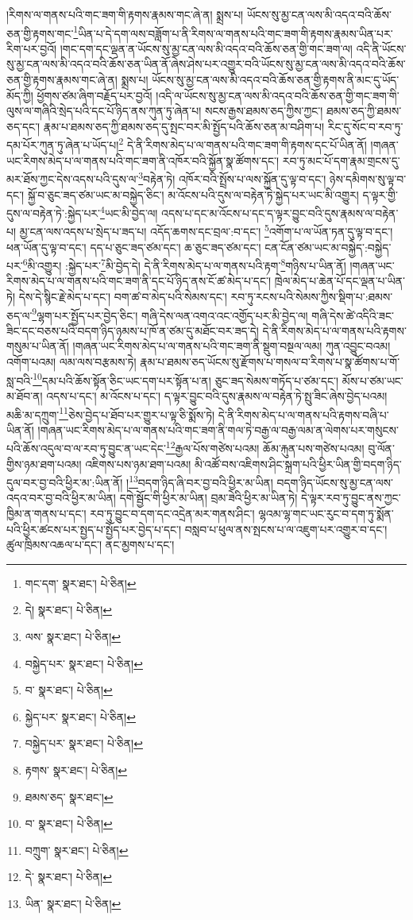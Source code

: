 །རིགས་ལ་གནས་པའི་གང་ཟག་གི་རྟགས་རྣམས་གང་ཞེ་ན། སྨྲས་པ། ཡོངས་སུ་མྱ་ངན་ལས་མི་འདའ་བའི་ཆོས་ཅན་གྱི་རྟགས་གང་\footnote{གང་དག་  སྣར་ཐང་།  པེ་ཅིན། }ཡིན་པ་དེ་དག་ལས་བཟློག་པ་ནི་རིགས་ལ་གནས་པའི་གང་ཟག་གི་རྟགས་རྣམས་ཡིན་པར་རིག་པར་བྱའོ། །གང་དག་དང་ལྡན་ན་ཡོངས་སུ་མྱ་ངན་ལས་མི་འདའ་བའི་ཆོས་ཅན་གྱི་གང་ཟག་ལ། འདི་ནི་ཡོངས་སུ་མྱ་ངན་ལས་མི་འདའ་བའི་ཆོས་ཅན་ཡིན་ནོ་ཞེས་ཤེས་པར་འགྱུར་བའི་ཡོངས་སུ་མྱ་ངན་ལས་མི་འདའ་བའི་ཆོས་ཅན་གྱི་རྟགས་རྣམས་གང་ཞེ་ན། སྨྲས་པ། ཡོངས་སུ་མྱ་ངན་ལས་མི་འདའ་བའི་ཆོས་ཅན་གྱི་རྟགས་ནི་མང་དུ་ཡོད་མོད་ཀྱི། ཕྱོགས་ཙམ་ཞིག་བརྗོད་པར་བྱའོ། །འདི་ལ་ཡོངས་སུ་མྱ་ངན་ལས་མི་འདའ་བའི་ཆོས་ཅན་གྱི་གང་ཟག་གི་ལུས་ལ་གཞིའི་སྲེད་པའི་དང་པོ་ཉིད་ནས་ཀུན་ཏུ་ཞེན་པ། སངས་རྒྱས་ཐམས་ཅད་ཀྱིས་ཀྱང་། ཐམས་ཅད་ཀྱི་ཐམས་ཅད་དང་། རྣམ་པ་ཐམས་ཅད་ཀྱི་ཐམས་ཅད་དུ་སྤང་བར་མི་སྤྱོད་པའི་ཆོས་ཅན་མ་བཤིག་པ། རིང་དུ་སོང་བ་རབ་ཏུ་དམ་པོར་ཀུན་ཏུ་ཞེན་པ་ཡོད་པ།\footnote{དེ།  སྣར་ཐང་།  པེ་ཅིན། } དེ་ནི་རིགས་མེད་པ་ལ་གནས་པའི་གང་ཟག་གི་རྟགས་དང་པོ་ཡིན་ནོ། །གཞན་ཡང་རིགས་མེད་པ་ལ་གནས་པའི་གང་ཟག་ནི་འཁོར་བའི་སྐྱོན་སྣ་ཚོགས་དང་། རབ་ཏུ་མང་པོ་དག་རྣམ་གྲངས་དུ་མར་ཐོས་ཀྱང་དེས་འདས་པའི་དུས་ལ་\footnote{ལས་  སྣར་ཐང་།  པེ་ཅིན། }བརྟེན་ཏེ། འཁོར་བའི་སྤྲོས་པ་ལས་སྐྱོན་དུ་ལྟ་བ་དང་། ཉེས་དམིགས་སུ་ལྟ་བ་དང་། སྐྱོ་བ་ཅུང་ཟད་ཙམ་ཡང་མ་བསྐྱེད་ཅིང་། མ་འོངས་པའི་དུས་ལ་བརྟེན་ཏེ་སྐྱེད་པར་ཡང་མི་འགྱུར། ད་ལྟར་གྱི་དུས་ལ་བརྟེན་ཏེ་:སྐྱེད་པར་\footnote{བསྐྱེད་པར་  སྣར་ཐང་།  པེ་ཅིན། }ཡང་མི་བྱེད་ལ། འདས་པ་དང་མ་འོངས་པ་དང་ད་ལྟར་བྱུང་བའི་དུས་རྣམས་ལ་བརྟེན་པ། མྱ་ངན་ལས་འདས་པ་སྲེད་པ་ཟད་པ། འདོད་ཆགས་དང་བྲལ་:བ་དང་། \footnote{བ་  སྣར་ཐང་།  པེ་ཅིན། }འགོག་པ་ལ་ཡོན་ཏན་དུ་ལྟ་བ་དང་། ཕན་ཡོན་དུ་ལྟ་བ་དང་། དད་པ་ཅུང་ཟད་ཙམ་དང་། ཆ་ཅུང་ཟད་ཙམ་དང་། ངན་ངོན་ཙམ་ཡང་མ་བསྐྱེད་:བསྐྱེད་པར་\footnote{སྐྱེད་པར་  སྣར་ཐང་།  པེ་ཅིན། }མི་འགྱུར། :སྐྱེད་པར་\footnote{བསྐྱེད་པར་  སྣར་ཐང་།  པེ་ཅིན། }མི་བྱེད་དེ། དེ་ནི་རིགས་མེད་པ་ལ་གནས་པའི་རྟག་\footnote{རྟགས་  སྣར་ཐང་།  པེ་ཅིན། }གཉིས་པ་ཡིན་ནོ། །གཞན་ཡང་རིགས་མེད་པ་ལ་གནས་པའི་གང་ཟག་ནི་དང་པོ་ཉིད་ནས་ངོ་ཚ་མེད་པ་དང་། ཁྲེལ་མེད་པ་ཆེན་པོ་དང་ལྡན་པ་ཡིན་ཏེ། དེས་དེ་སྙིང་རྗེ་མེད་པ་དང་། བག་ཚ་བ་མེད་པའི་སེམས་དང་། རབ་ཏུ་རངས་པའི་སེམས་ཀྱིས་སྡིག་པ་:ཐམས་ཅད་ལ་\footnote{ཐམས་ཅད་  སྣར་ཐང་། }ལྷག་པར་སྤྱོད་པར་བྱེད་ཅིང་། གཞི་དེས་ལན་འགའ་འང་འགྱོད་པར་མི་བྱེད་ལ། གཞི་དེས་ཚེ་འདིའི་ཟང་ཟིང་དང་བཅས་པའི་བདག་ཉིད་ཉམས་པ་ཁོ་ན་ཙམ་དུ་མཐོང་བར་ཟད་དེ། དེ་ནི་རིགས་མེད་པ་ལ་གནས་པའི་རྟགས་གསུམ་པ་ཡིན་ནོ། །གཞན་ཡང་རིགས་མེད་པ་ལ་གནས་པའི་གང་ཟག་ནི་སྡུག་བསྔལ་ལམ། ཀུན་འབྱུང་བའམ། འགོག་པའམ། ལམ་ལས་བརྩམས་ཏེ། རྣམ་པ་ཐམས་ཅད་ཡོངས་སུ་རྫོགས་པ་གསལ་བ་རིགས་པ་སྣ་ཚོགས་པ་གོ་སླ་བའི་\footnote{བ་  སྣར་ཐང་།  པེ་ཅིན། }དམ་པའི་ཆོས་སྟོན་ཅིང་ཡང་དག་པར་སྟོན་པ་ན། ཅུང་ཟད་སེམས་གཏོད་པ་ཙམ་དང་། མོས་པ་ཙམ་ཡང་མ་ཐོབ་ན། འདས་པ་དང་། མ་འོངས་པ་དང་། ད་ལྟར་བྱུང་བའི་དུས་རྣམས་ལ་བརྟེན་ཏེ་སྤུ་ཟིང་ཞེས་བྱེད་པའམ། མཆི་མ་དཀྲུག་\footnote{བཀྲུག་  སྣར་ཐང་།  པེ་ཅིན། }ཅེས་བྱེད་པ་ཐོབ་པར་གྱུར་པ་ལྟ་ཅི་སྨོས་ཏེ། དེ་ནི་རིགས་མེད་པ་ལ་གནས་པའི་རྟགས་བཞི་པ་ཡིན་ནོ། །གཞན་ཡང་རིགས་མེད་པ་ལ་གནས་པའི་གང་ཟག་ནི་གལ་ཏེ་བརྒྱ་ལ་བརྒྱ་ལམ་ན་ལེགས་པར་གསུངས་པའི་ཆོས་འདུལ་བ་ལ་རབ་ཏུ་བྱུང་ན་ཡང་དེང་\footnote{དེ་  སྣར་ཐང་།  པེ་ཅིན། }རྒྱལ་པོས་གཙེས་པའམ། ཆོམ་རྐུན་པས་གཙེས་པའམ། བུ་ལོན་གྱིས་ཉམ་ཐག་པའམ། འཇིགས་པས་ཉམ་ཐག་པའམ། མི་འཚོ་བས་འཇིགས་ཤིང་སྐྲག་པའི་ཕྱིར་ཡིན་གྱི་བདག་ཉིད་དུལ་བར་བྱ་བའི་ཕྱིར་མ་:ཡིན་ནོ། །\footnote{ཡིན་  སྣར་ཐང་།  པེ་ཅིན། }བདག་ཉིད་ཞི་བར་བྱ་བའི་ཕྱིར་མ་ཡིན། བདག་ཉིད་ཡོངས་སུ་མྱ་ངན་ལས་འདའ་བར་བྱ་བའི་ཕྱིར་མ་ཡིན། དགེ་སྦྱོང་གི་ཕྱིར་མ་ཡིན། བྲམ་ཟེའི་ཕྱིར་མ་ཡིན་ཏེ། དེ་ལྟར་རབ་ཏུ་བྱུང་ནས་ཀྱང་ཁྱིམ་ན་གནས་པ་དང་། རབ་ཏུ་བྱུང་བ་དག་དང་འདྲེན་མར་གནས་ཤིང་། ལྷའམ་ལྷ་གང་ཡང་རུང་བ་དག་ཏུ་སྨོན་པའི་ཕྱིར་ཚངས་པར་སྤྱད་པ་སྤྱོད་པར་བྱེད་པ་དང་། བསླབ་པ་ཕུལ་ནས་སྤངས་པ་ལ་འཇུག་པར་འགྱུར་བ་དང་། ཚུལ་ཁྲིམས་འཆལ་པ་དང་། ནང་མྱགས་པ་དང་། 